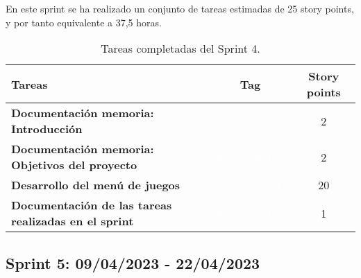 En este sprint se ha realizado un conjunto de tareas estimadas de 25 story points, y por tanto equivalente a 37,5 horas.

\begin{table}[ht!]
    \centering
    \resizebox{15cm}{!} {
    \begin{tabular}{|l|c|c|}
    \hline
    \rowcolor[rgb]{0.99,0.93,0.93}
    \textbf{Tareas}     &\textbf{Tag}     & \textbf{Story points} \\ \hline
    \textbf{Documentación memoria: Introducción}          &\cellcolor[rgb]{0.0,0.33,0.71}\textcolor{white}{documentation}      &2 \\ \hline 
    \textbf{Documentación memoria: Objetivos del proyecto}          &\cellcolor[rgb]{0.0,0.33,0.71}\textcolor{white}{documentation}      &2 \\ \hline 
    \textbf{Desarrollo del menú de juegos}         &\cellcolor[rgb]{0.99,0.83,0.93}\textcolor{white}{development}      &20 \\ \hline 
    \textbf{Documentación de las tareas realizadas en el sprint}         &\cellcolor[rgb]{0.0,0.33,0.71}\textcolor{white}{documentation}      &1 \\ \hline 
    \end{tabular}}
    \caption{Tareas completadas del Sprint 4.}
    \label{tab:my_label}
\end{table}

\subsection{Sprint 5: 09/04/2023 - 22/04/2023}
